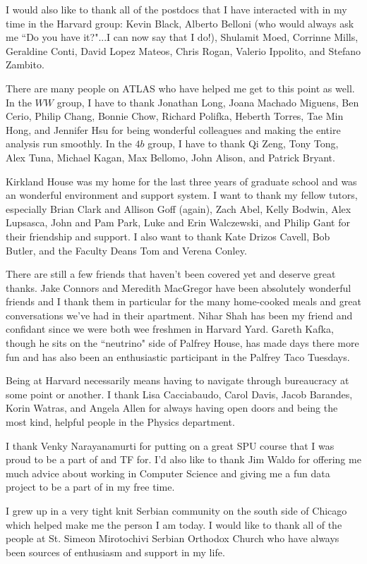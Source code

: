 \begin{doublespace}
I would also like to thank all of the postdocs that I have interacted with in my time in the Harvard group: Kevin Black, Alberto Belloni (who would always ask me ``Do you have it?"...I can now say that I do!), Shulamit Moed, Corrinne Mills, Geraldine Conti, David Lopez Mateos, Chris Rogan, Valerio Ippolito, and Stefano Zambito. 

There are many people on ATLAS who have helped me get to this point as well. In the $WW$ group, I have to thank Jonathan Long, Joana Machado Miguens, Ben Cerio, Philip Chang, Bonnie Chow, Richard Polifka, Heberth Torres, Tae Min Hong, and Jennifer Hsu for being wonderful colleagues and making the entire analysis run smoothly. In the $4b$ group, I have to thank Qi Zeng, Tony Tong, Alex Tuna, Michael Kagan, Max Bellomo, John Alison, and Patrick Bryant. 

Kirkland House was my home for the last three years of graduate school and was an wonderful environment and support system. I want to thank my fellow tutors, especially Brian Clark and Allison Goff (again), Zach Abel, Kelly Bodwin, Alex Lupsasca, John and Pam Park, Luke and Erin Walczewski, and Philip Gant for their friendship and support. I also want to thank Kate Drizos Cavell, Bob Butler, and the Faculty Deans Tom and Verena Conley.

There are still a few friends that haven't been covered yet and deserve great thanks. Jake Connors and Meredith MacGregor have been absolutely wonderful friends and I thank them in particular for the many home-cooked meals and great conversations we've had in their apartment. Nihar Shah has been my friend and confidant since we were both wee freshmen in Harvard Yard. Gareth Kafka, though he sits on the ``neutrino" side of Palfrey House, has made days there more fun and has also been an enthusiastic participant in the Palfrey Taco Tuesdays.  

Being at Harvard necessarily means having to navigate through bureaucracy at some point or another. I thank Lisa Cacciabaudo, Carol Davis, Jacob Barandes, Korin Watras, and Angela Allen for always having open doors and being the most kind, helpful people in the Physics department. 

I thank Venky Narayanamurti for putting on a great SPU course that I was proud to be a part of and TF for. I'd also like to thank Jim Waldo for offering me much advice about working in Computer Science and giving me a fun data project to be a part of in my free time. 

I grew up in a very tight knit Serbian community on the south side of Chicago which helped make me the person I am today. I would like to thank all of the people at St. Simeon Mirotochivi Serbian Orthodox Church who have always been sources of enthusiasm and support in my life. 


\end{doublespace}
